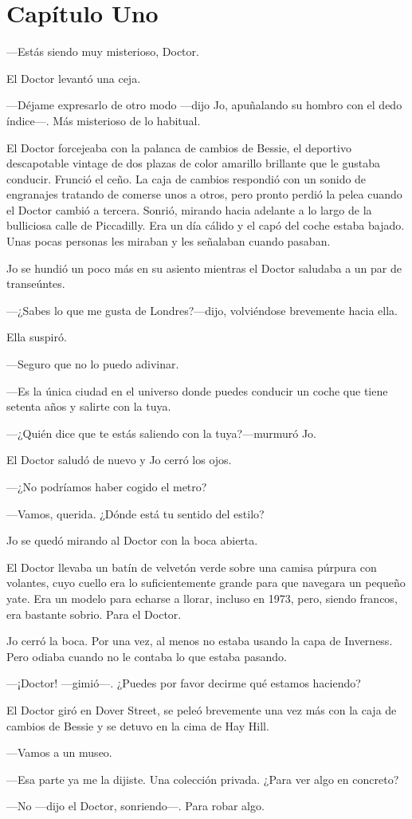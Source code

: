 \chapter*{Capítulo Uno}

---Estás siendo muy misterioso, Doctor.

El Doctor levantó una ceja.

---Déjame expresarlo de otro modo ---dijo Jo, apuñalando su hombro con
el dedo índice---. Más misterioso de lo habitual.

El Doctor forcejeaba con la palanca de cambios de Bessie, el deportivo
descapotable vintage de dos plazas de color amarillo brillante que le
gustaba conducir. Frunció el ceño. La caja de cambios respondió con un
sonido de engranajes tratando de comerse unos a otros, pero pronto
perdió la pelea cuando el Doctor cambió a tercera. Sonrió, mirando hacia
adelante a lo largo de la bulliciosa calle de Piccadilly. Era un día
cálido y el capó del coche estaba bajado. Unas pocas personas les
miraban y les señalaban cuando pasaban.

Jo se hundió un poco más en su asiento mientras el Doctor saludaba a un
par de transeúntes.

---¿Sabes lo que me gusta de Londres?---dijo, volviéndose brevemente
hacia ella.

Ella suspiró.

---Seguro que no lo puedo adivinar.

---Es la única ciudad en el universo donde puedes conducir un coche que
tiene setenta años y salirte con la tuya.

---¿Quién dice que te estás saliendo con la tuya?---murmuró Jo.

El Doctor saludó de nuevo y Jo cerró los ojos.

---¿No podríamos haber cogido el metro?

---Vamos, querida. ¿Dónde está tu sentido del estilo?

Jo se quedó mirando al Doctor con la boca abierta.

El Doctor llevaba un batín de velvetón verde sobre una camisa púrpura
con volantes, cuyo cuello era lo suficientemente grande para que
navegara un pequeño yate. Era un modelo para echarse a llorar, incluso
en 1973, pero, siendo francos, era bastante sobrio. Para el Doctor.

Jo cerró la boca. Por una vez, al menos no estaba usando la capa de
Inverness. Pero odiaba cuando no le contaba lo que estaba pasando.

---¡Doctor! ---gimió---. ¿Puedes por favor decirme qué estamos haciendo?

El Doctor giró en Dover Street, se peleó brevemente una vez más con la
caja de cambios de Bessie y se detuvo en la cima de Hay Hill.

---Vamos a un museo.

---Esa parte ya me la dijiste. Una colección privada. ¿Para ver algo en
concreto?

---No ---dijo el Doctor, sonriendo---. Para robar algo.